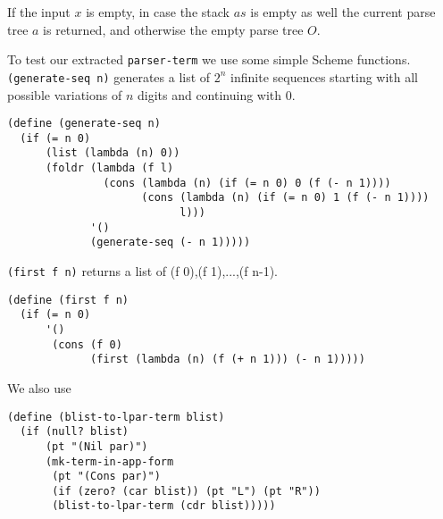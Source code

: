 \documentclass[12pt]{amsart}
\newcommand{\as}{\mathit{a}\!\mathit{s}}
\begin{document}
\begin{appendix}
If the input $x$ is empty, in case the stack $\as$ is empty as well
the current parse tree $a$ is returned, and otherwise the empty parse
tree $O$.

To test our extracted \verb|parser-term| we use some simple Scheme
functions.  \verb|(generate-seq n)| generates a list of $2^n$ infinite
sequences starting with all possible variations of $n$ digits and
continuing with $0$.
\begin{verbatim}
(define (generate-seq n)
  (if (= n 0)
      (list (lambda (n) 0))
      (foldr (lambda (f l)
               (cons (lambda (n) (if (= n 0) 0 (f (- n 1))))
                     (cons (lambda (n) (if (= n 0) 1 (f (- n 1))))
                           l)))
             '()
             (generate-seq (- n 1)))))
\end{verbatim}
\verb|(first f n)| returns a list of (f 0),(f 1),...,(f n-1).
\begin{verbatim}
(define (first f n)
  (if (= n 0)
      '()
       (cons (f 0)
             (first (lambda (n) (f (+ n 1))) (- n 1)))))
\end{verbatim}
We also use
\begin{verbatim}
(define (blist-to-lpar-term blist)
  (if (null? blist)
      (pt "(Nil par)")
      (mk-term-in-app-form
       (pt "(Cons par)")
       (if (zero? (car blist)) (pt "L") (pt "R"))
       (blist-to-lpar-term (cdr blist)))))


\end{verbatim}
\end{appendix}
\end{document}
